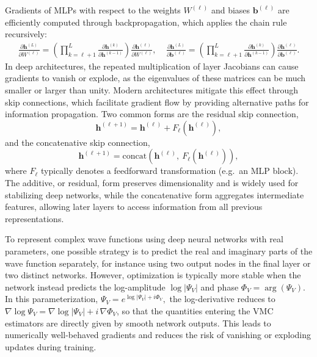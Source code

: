 Gradients of MLPs with respect to the weights $W^{(\ell)}$ and biases $\boldsymbol{b}^{(\ell)}$ are efficiently computed through backpropagation, which applies the chain rule recursively:
\begin{align}
    \frac{\partial \boldsymbol{h}^{(L)}}{\partial W^{(\ell)}} 
    = \left( \prod_{k=\ell+1}^L \frac{\partial \boldsymbol{h}^{(k)}}{\partial \boldsymbol{h}^{(k-1)}} \right) \frac{\partial \boldsymbol{h}^{(\ell)}}{\partial W^{(\ell)}}, \ \ \ \ \
    \frac{\partial \boldsymbol{h}^{(L)}}{\partial \boldsymbol{b}^{(\ell)}} 
    = \left( \prod_{k=\ell+1}^L \frac{\partial \boldsymbol{h}^{(k)}}{\partial \boldsymbol{h}^{(k-1)}} \right) \frac{\partial \boldsymbol{h}^{(\ell)}}{\partial \boldsymbol{b}^{(\ell)}}.
\end{align}
In deep architectures, the repeated multiplication of layer Jacobians can cause gradients to vanish or explode, as the eigenvalues of these matrices can be much smaller or larger than unity. Modern architectures mitigate this effect through skip connections, which facilitate gradient flow by providing alternative paths for information propagation. Two common forms are the residual skip connection,
\begin{equation}
    \boldsymbol{h}^{(\ell+1)} = \boldsymbol{h}^{(\ell)} + F_\ell \!\left(\boldsymbol{h}^{(\ell)}\right),
\end{equation}
and the concatenative skip connection,
\begin{equation}
    \boldsymbol{h}^{(\ell+1)} = \mathrm{concat} \!\left(\boldsymbol{h}^{(\ell)}, \  F_\ell \!\left(\boldsymbol{h}^{(\ell)}\right)\right),
\end{equation}
where $F_\ell$ typically denotes a feedforward transformation (e.g.\ an MLP block). The additive, or residual, form preserves dimensionality and is widely used for stabilizing deep networks, while the concatenative form aggregates intermediate features, allowing later layers to access information from all previous representations.


To represent complex wave functions using deep neural networks with real parameters, one possible strategy is to predict the real and imaginary parts of the wave function separately, for instance using two output nodes in the final layer or two distinct networks. However, optimization is typically more stable when the network instead predicts the log-amplitude $\log |\Psi_V|$ and phase $\Phi_V = \arg(\Psi_V)$. In this parameterization,
$\Psi_V = e^{\log |\Psi_V| + i \Phi_V},$
the log-derivative reduces to
$\nabla \log \Psi_V = \nabla \log|\Psi_V| + i\,\nabla \Phi_V$, so that the quantities entering the VMC estimators are directly given by smooth network outputs. This leads to numerically well-behaved gradients and reduces the risk of vanishing or exploding updates during training.


